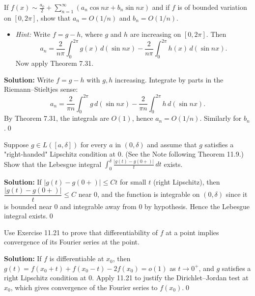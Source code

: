 \begin{problembox}
If $f(x) \sim \frac{a_0}{2} + \sum_{n=1}^\infty (a_n \cos nx + b_n \sin nx)$ and if $f$ is of bounded variation on $[0, 2\pi]$, show that $a_n = O(1/n)$ and $b_n = O(1/n)$.
\begin{itemize}
\item \textit{Hint:} Write $f = g - h$, where $g$ and $h$ are increasing on $[0, 2\pi]$. Then
\[
a_n = \frac{2}{n\pi} \int_0^{2\pi} g(x) \, d(\sin nx) - \frac{2}{n\pi} \int_0^{2\pi} h(x) \, d(\sin nx).
\]
Now apply Theorem 7.31.
\end{itemize}
\end{problembox}

\noindent\textbf{Solution:}
Write $f=g-h$ with $g,h$ increasing. Integrate by parts in the Riemann–Stieltjes sense:
\[a_n=\frac{2}{\pi n}\int_0^{2\pi} g\,d(\sin nx)-\frac{2}{\pi n}\int_0^{2\pi} h\,d(\sin nx).\]
By Theorem 7.31, the integrals are $O(1)$, hence $a_n=O(1/n)$. Similarly for $b_n$.\qed


\begin{problembox}
Suppose $g \in L([a, \delta])$ for every $a$ in $(0, \delta)$ and assume that $g$ satisfies a "right-handed" Lipschitz condition at 0. (See the Note following Theorem 11.9.) Show that the Lebesgue integral $\int_0^\delta \frac{|g(t) - g(0+)|}{t} \, dt$ exists.
\end{problembox}

\noindent\textbf{Solution:}
If $|g(t)-g(0+)|\le C t$ for small $t$ (right Lipschitz), then $\dfrac{|g(t)-g(0+)|}{t}\le C$ near $0$, and the function is integrable on $(0,\delta)$ since it is bounded near $0$ and integrable away from $0$ by hypothesis. Hence the Lebesgue integral exists.\qed


\begin{problembox}
Use Exercise 11.21 to prove that differentiability of $f$ at a point implies convergence of its Fourier series at the point.
\end{problembox}

\noindent\textbf{Solution:}
If $f$ is differentiable at $x_0$, then $g(t)=f(x_0+t)+f(x_0-t)-2f(x_0)=o(1)$ as $t\to0^+$, and $g$ satisfies a right Lipschitz condition at $0$. Apply 11.21 to justify the Dirichlet–Jordan test at $x_0$, which gives convergence of the Fourier series to $f(x_0)$.\qed


